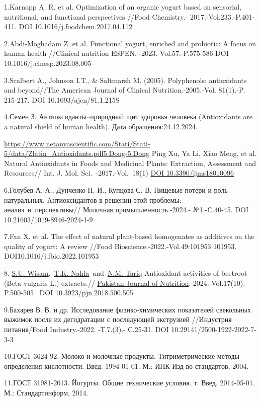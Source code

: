 \begin{references}
1.Karnopp A. R. et al. Optimization of an organic yogurt based on
sensorial, nutritional, and functional perspectives //Food Chemistry.-
2017.-Vol.233.-P.401-411.
DOI 10.1016/j.foodchem.2017.04.112

2.Abdi-Moghadam Z. et al. Functional yogurt, enriched and probiotic: A
focus on human health //Clinical nutrition ESPEN.
-2023.-Vol.57.-P.575-586
DOI 10.1016/j.clnesp.2023.08.005

3.Scalbert A., Johnson I.T., \& Saltmarsh M. (2005). Polyphenols:
antioxidants and beyond//The American Journal of Clinical
Nutrition.-2005.-Vol. 81(1).-P. 215-217.
DOI 10.1093/ajcn/81.1.215S

4.Семен З. Антиоксиданты--природный щит здоровья человека (Antioxidants
are a natural shield of human health). Дата обращения:24.12.2024.

\href{https://www.netanyascientific.com/Stati/Stati-5/data/Zlatin_Antioxidants.pdf5.Dong-5.Dong}{https://www.netanyascientific.com/Stati/Stati-5/data/Zlatin\_Antioxidants.pdf5.Dong-5.Dong}
Ping Xu, Ya Li, Xiao Meng, et al. Natural Antioxidants in Foods and
Medicinal Plants: Extraction, Assessment and Resources// Int. J. Mol.
Sci\emph{.}~-2017.-Vol.~18(1)
\href{https://doi.org/10.3390/ijms18010096}{DOI 10.3390/ijms18010096}

6.Голубев А. А., Дунченко Н. И., Купцова С. В. Пищевые потери и роль
натуральных. Aнтиоксидантов в решении этой проблемы:
анализ~и~перспективы// Молочная промышленность.-2024.- №1.-C.40-45. DOI
10.21603/1019-8946-2024-1-9

7.Fan X. et al. The effect of natural plant-based homogenates as
additives on the quality of yogurt: A review //Food
Bioscience.-2022.-Vol.49:101953
101953. DOI10.1016/j.fbio.2022.101953

8. \href{https://ascidatabase.com/author.php?ascicat=ALL&author=S.U.&mid=&last=Wisam}{S.U.
Wisam},~\href{https://ascidatabase.com/author.php?ascicat=ALL&author=T.K.&mid=&last=Nahla}{T.K.
Nahla}~and~\href{https://ascidatabase.com/author.php?ascicat=ALL&author=N.M.&mid=&last=Tariq}{N.M.
Tariq} Antioxidant activities of beetroot (Beta vulgaris L.) extracts.//
\href{https://www.researchgate.net/journal/Pakistan-Journal-of-Nutrition-1680-5194?_tp=eyJjb250ZXh0Ijp7ImZpcnN0UGFnZSI6InB1YmxpY2F0aW9uIiwicGFnZSI6InB1YmxpY2F0aW9uIn19}{Pakistan
Journal of Nutrition}.-2024.-Vol.17(10).-P.500-505~
DOI 10.3923/pjn.2018.500.505

9.Бахарев В. В. и др. Исследование физико-химических показателей
свекольных выжимок после их дегидратации с последующей экструзией
//Индустрия питания/Food Industry.-2022. -Т.7.(3).- С.25-31. DOI
10.29141/2500-1922-2022-7-3-3

10.ГОСТ 3624-92. Молоко и молочные продукты. Титриметрические методы
определения кислотности. Введ. 1994-01-01. М.: ИПК Изд-во стандартов,
2004.

11.ГОСТ 31981-2013. Йогурты. Общие технические условия. т. Введ.
2014-05-01. М.: Стандартинформ, 2014.
\end{references}


